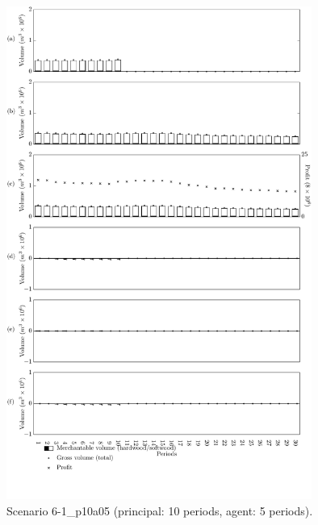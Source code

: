 \begin{figure}[h]
  \centering
  \includegraphics[width=10cm]{images/appendix/s6-1_p10a05}
  \caption{Scenario 6-1\_p10a05 (principal: 10 periods, agent: 5 periods).}
  \label{fig:s6-1_p10a05}
\end{figure}

